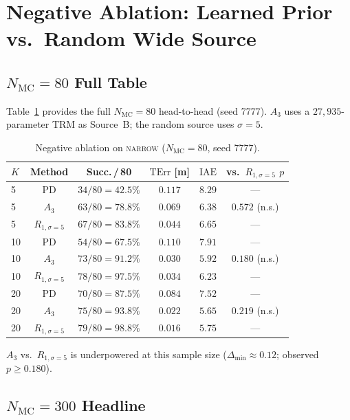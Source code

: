 \documentclass[11pt,a4paper]{article}
\newcommand{\Nm}{N_{\mathrm{MC}}}
\newcommand{\TErr}{\mathrm{TErr}}
\newcommand{\IAE}{\mathrm{IAE}}
\begin{document}
\section{Negative Ablation: Learned Prior vs.\ Random Wide Source}
\label{sec:S3}

\subsection{$\Nm = 80$ Full Table}

Table~\ref{tab:s3-negabl} provides the full $\Nm = 80$ head-to-head
(seed 7777). $A_3$ uses a $27{,}935$-parameter TRM as Source~B; the
random source uses $\sigma = 5$.

\begin{table}[h]
\centering
\caption{Negative ablation on \textsc{narrow} ($\Nm = 80$, seed 7777).}\label{tab:s3-negabl}
\begin{tabular}{lccccc}
\toprule
$K$ & Method & Succ.\,/\,80 & $\TErr$ [m] & $\IAE$ & vs.\ $R_{1,\sigma=5}$ $p$ \\
\midrule
5  & PD          & $34/80 = 42.5\%$  & $0.117$ & $8.29$ & --- \\
5  & $A_3$       & $63/80 = 78.8\%$  & $0.069$ & $6.38$ & $0.572$ (n.s.) \\
5  & $R_{1,\sigma=5}$ & $67/80 = 83.8\%$  & $0.044$ & $6.65$ & --- \\
\midrule
10 & PD          & $54/80 = 67.5\%$  & $0.110$ & $7.91$ & --- \\
10 & $A_3$       & $73/80 = 91.2\%$  & $0.030$ & $5.92$ & $0.180$ (n.s.) \\
10 & $R_{1,\sigma=5}$ & $78/80 = 97.5\%$  & $0.034$ & $6.23$ & --- \\
\midrule
20 & PD          & $70/80 = 87.5\%$  & $0.084$ & $7.52$ & --- \\
20 & $A_3$       & $75/80 = 93.8\%$  & $0.022$ & $5.65$ & $0.219$ (n.s.) \\
20 & $R_{1,\sigma=5}$ & $79/80 = 98.8\%$  & $0.016$ & $5.75$ & --- \\
\bottomrule
\end{tabular}
\par\smallskip
$A_3$ vs.\ $R_{1,\sigma=5}$ is underpowered at this sample size
($\Delta_{\min} \approx 0.12$; observed $p \ge 0.180$).
\end{table}

\subsection{$\Nm = 300$ Headline}
\end{document}
